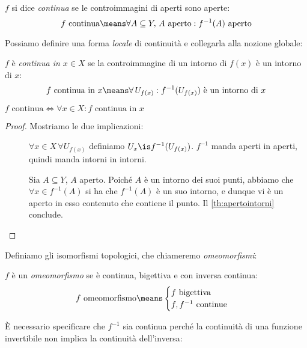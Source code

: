 \begin{defn}[Continuità]
	$f$ si dice \emph{continua} se le controimmagini di aperti sono aperte:
	\[f\text{ continua}\means
	\forall A\subseteq Y,\,A\text{ aperto}:f^{-1}(A)\text{ aperto}\]
\end{defn}

Possiamo definire una forma \emph{locale} di continuità e collegarla alla nozione globale:

\begin{defn}
	$f$ è \emph{continua in $x\in X$} se la controimmagine di un intorno di $f(x)$ è un intorno di $x$:
	\[f\text{ continua in }x\means
	\forall\, U_{f(x)}:f^{-1}(U_{f(x)})\text{ è un intorno di }x\]
\end{defn}

\begin{prop}
	$f\text{ continua}\iff\forall x\in X:f\text{ continua in }x$
\end{prop}

\begin{proof}
	Mostriamo le due implicazioni:
	\begin{description}
		\item[\proofrightarrow]
			$\forall x\in X\,\forall U_{f(x)}$ definiamo $U_x\is f^{-1}(U_{f(x)})$.
			$f^{-1}$ manda aperti in aperti, quindi manda intorni in intorni.
		\item[\proofleftarrow]
			Sia  $A\subseteq Y$, $A$ aperto.
			Poiché $A$ è un intorno dei suoi punti, abbiamo che
			$\forall x\in f^{-1}(A)$ si ha che $f^{-1}(A)$ è un suo intorno, e dunque vi è un aperto in esso contenuto che contiene il punto.
			Il \autoref{th:apertointorni} conclude.
			\qedhere
	\end{description}
\end{proof}

Definiamo gli isomorfismi topologici, che chiameremo \emph{omeomorfismi}:

\begin{defn}[Omeomorfismo]
	$f$ è un \emph{omeomorfismo} se è continua, bigettiva e con inversa continua:
	\[f\text{ omeomorfismo}\means
	\begin{cases}
		f\text{ bigettiva }\\
		f, f^{-1}\text{ continue}
	\end{cases}\]
\end{defn}

È necessario specificare che $f^{-1}$ sia continua perché la continuità di una funzione invertibile non implica la continuità dell'inversa:

